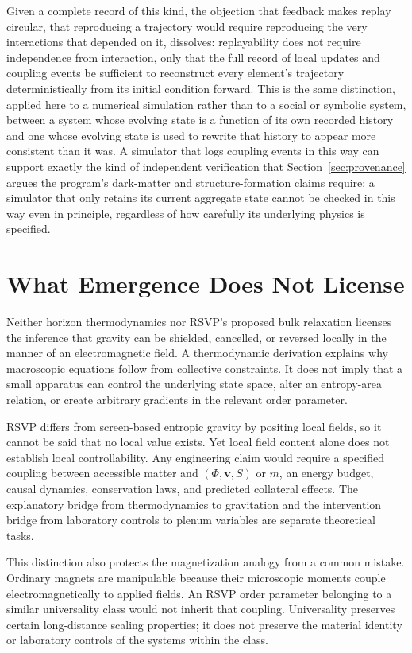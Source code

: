 \documentclass[11pt]{article}
\begin{document}
Given a complete record of this kind, the objection that feedback makes replay circular, that reproducing a trajectory would require reproducing the very interactions that depended on it, dissolves: replayability does not require independence from interaction, only that the full record of local updates and coupling events be sufficient to reconstruct every element's trajectory deterministically from its initial condition forward. This is the same distinction, applied here to a numerical simulation rather than to a social or symbolic system, between a system whose evolving state is a function of its own recorded history and one whose evolving state is used to rewrite that history to appear more consistent than it was. A simulator that logs coupling events in this way can support exactly the kind of independent verification that Section~\ref{sec:provenance} argues the program's dark-matter and structure-formation claims require; a simulator that only retains its current aggregate state cannot be checked in this way even in principle, regardless of how carefully its underlying physics is specified.

\section{What Emergence Does Not License}
\label{sec:limits}

Neither horizon thermodynamics nor RSVP's proposed bulk relaxation licenses the inference that gravity can be shielded, cancelled, or reversed locally in the manner of an electromagnetic field. A thermodynamic derivation explains why macroscopic equations follow from collective constraints. It does not imply that a small apparatus can control the underlying state space, alter an entropy-area relation, or create arbitrary gradients in the relevant order parameter.

RSVP differs from screen-based entropic gravity by positing local fields, so it cannot be said that no local value exists. Yet local field content alone does not establish local controllability. Any engineering claim would require a specified coupling between accessible matter and $(\Phi,\mathbf{v},S)$ or $m$, an energy budget, causal dynamics, conservation laws, and predicted collateral effects. The explanatory bridge from thermodynamics to gravitation and the intervention bridge from laboratory controls to plenum variables are separate theoretical tasks.

This distinction also protects the magnetization analogy from a common mistake. Ordinary magnets are manipulable because their microscopic moments couple electromagnetically to applied fields. An RSVP order parameter belonging to a similar universality class would not inherit that coupling. Universality preserves certain long-distance scaling properties; it does not preserve the material identity or laboratory controls of the systems within the class.
\end{document}
